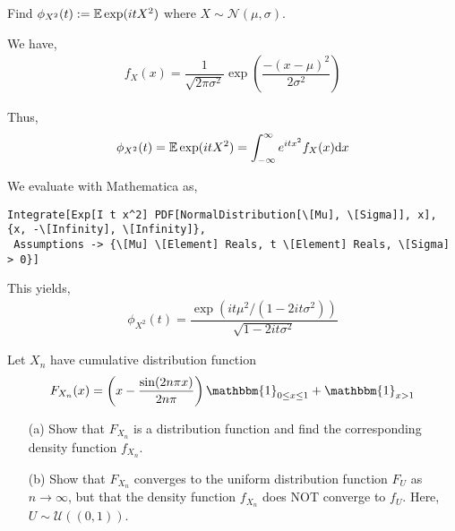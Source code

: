 \begin{problem}[Exercise 3.5]
    Find \( \phi_{X^2}(t):=\mathbb{E} \exp(itX^2) \) where \( X\sim \mathcal{N}(\mu,\sigma) \).
\end{problem}

\begin{solution}[Solution]
We have,
\begin{align*}
    f_X(x) = \dfrac{1}{\sqrt{2\pi\sigma^2}}\exp\left(\dfrac{-(x-\mu)^2}{2\sigma^2}\right) 
\end{align*}

Thus,
\begin{align*}
    \phi_{X^2}(t) = \mathbb{E} \exp(itX^2) = \int_{-\infty}^{\infty} e^{itx^2}f_X(x)\mathrm{d} x 
\end{align*}

We evaluate with Mathematica as,
\begin{lstlisting}
Integrate[Exp[I t x^2] PDF[NormalDistribution[\[Mu], \[Sigma]], x], {x, -\[Infinity], \[Infinity]}, 
 Assumptions -> {\[Mu] \[Element] Reals, t \[Element] Reals, \[Sigma] > 0}]
\end{lstlisting}

This yields,
\begin{align*}
    \phi_{X^2}(t) = \dfrac{\exp(it\mu^2/(1-2it\sigma^2))}{\sqrt{1-2it\sigma^2}}
\end{align*}
\end{solution}

\begin{problem}[Exercise 3.6]
    Let \( X_n \) have cumulative distribution function
    \begin{align*}
        F_{X_n}(x)=\left(x-\dfrac{\sin(2n\pi x)}{2n\pi}\right)\mathbbm{1}_{0\leq x\leq 1}+\mathbbm{1}_{x>1}
    \end{align*}
    \begin{enumerate}
        \item[(a)] Show that \( F_{X_n} \) is a distribution function and find the corresponding density function \( f_{X_n} \).
        \item[(b)] Show that \( F_{X_n} \) converges to the uniform distribution function \( F_U \) as \( n \to\infty \), but that the density function \( f_{X_n} \) does NOT converge to \( f_U \). Here, \( U\sim \mathcal{U}((0,1)) \).
    \end{enumerate}
\end{problem}

